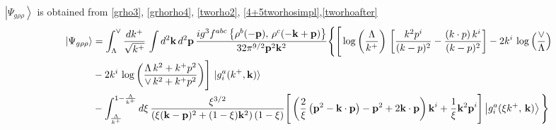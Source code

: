 \documentclass[10pt]{article}
\numberwithin{equation}{section}
\begin{document}
$\left|\Psi_{g\rho\rho}\right\rangle$ is obtained from \eqref{grho3}, \eqref{grhorho4}, \eqref{tworho2}, \eqref{4+5tworhosimpl},\eqref{tworhoafter}
\begin{align}\label{combinedgrhorho}
    \left|\Psi_{g\rho\rho}\right\rangle & =  \int_{\Lambda}^{\vee}\frac{dk^{+}}{\sqrt{k^{+}}}\,\int d^{2}\mathbf{k}\, d^{2}\mathbf{p}\,\frac{ig^{3}f^{abc}\left\{ \rho^{b}(-\mathbf{p}),\,\rho^{c}(-\mathbf{k}+\mathbf{p})\right\}}{32\pi^{9/2}\mathbf{p}^{2}\mathbf{k}^{2}}\Bigg\{\Bigg[\log{\left(\frac{\Lambda}{k^{+}}\right)}\,\left[\frac{k^{2}p^{i}}{(k-p)^{2}}-\frac{(k\cdot p)\,k^{i}}{(k-p)^{2}}\right]-2k^{i}\,\log{\left(\frac{\vee}{\Lambda}\right)}\notag \\ & -2k^{i}\,\log{\left(\frac{\Lambda\,k^{2} + k^{+}p^{2}}{\vee\, k^{2}+k^{+}p^{2}}\right)}\Bigg]\, \ket{g^{a}_{i}(k^{+},\mathbf{k})} \notag \\ & -\int_{\frac{\Lambda}{k^{+}}}^{1-\frac{\Lambda}{k^{+}}}d\xi\,\frac{\xi^{3/2}}{\left(\xi(\mathbf{k}-\mathbf{p})^{2}+(1-\xi)\mathbf{k}^{2}\right)(1-\xi)}\Bigg[\left(\frac{2}{\xi}\left(\mathbf{p}^{2}-\mathbf{k}\cdot\mathbf{p}\right)-\mathbf{p}^{2}+2\mathbf{k}\cdot\mathbf{p}\right)\mathbf{k}^{i} +\frac{1}{\xi}\mathbf{k}^{2}\mathbf{p}^{i}\Bigg]\left|g_{i}^{a}(\xi k^{+},\,\mathbf{k})\right\rangle \Bigg\} 
\end{align}
\end{document}
